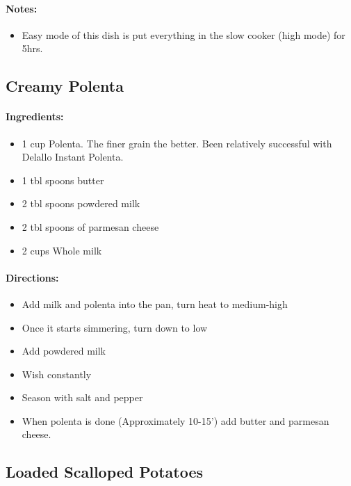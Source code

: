 \documentclass{article}
\begin{document}
\paragraph{Notes:}
\begin{itemize}
    \item Easy mode of this dish is put everything in the slow cooker (high mode) for 5hrs.
\end{itemize}

\subsection{Creamy Polenta}

\paragraph{Ingredients:}
\begin{itemize}
    \item 1 cup Polenta. The finer grain the better. Been relatively successful with Delallo Instant Polenta.
    \item 1 tbl spoons butter
    \item 2 tbl spoons powdered milk
    \item 2 tbl spoons of parmesan cheese
    \item 2 cups Whole milk
\end{itemize}

\paragraph{Directions:}
\begin{itemize}
    \item Add milk and polenta into the pan, turn heat to medium-high
    \item Once it starts simmering, turn down to low
    \item Add powdered milk
    \item Wish constantly
    \item Season with salt and pepper
    \item When polenta is done (Approximately 10-15’) add butter and parmesan cheese.
\end{itemize}

\subsection{Loaded Scalloped Potatoes}
\end{document}
